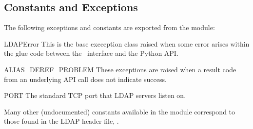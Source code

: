 

\subsection{Constants and Exceptions}

The following exceptions and constants are exported from the module:

\renewcommand{\indexsubitem}{(in module ldap)}


\begin{excdesc}{LDAPError}
This is the base exeception class raised when some error arises within
the glue code between the \C\ interface and the Python API.
\end{excdesc}


\begin{excdesc}{ALIAS_DEREF_PROBLEM}
These exceptions are raised when a result code from an underlying API
call does not indicate success.
\end{excdesc}


\begin{datadesc}{PORT}
The standard TCP port that LDAP servers listen on.
\end{datadesc}


Many other (undocumented) constants available in the module correspond 
to those found in the LDAP header file, .
